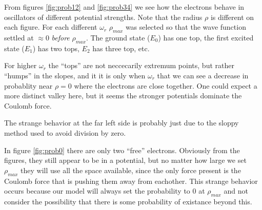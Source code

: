 

From figures \ref{fig:prob12} and \ref{fig:prob34} we see how the electrons behave in oscillators of different potential strengths. Note that the radius $\rho$ is different on each figure. For each different $\omega_r$ $\rho_{max}$ was selected so that the wave function settled at $\approx 0$ \emph{before} $\rho_{max}$. The ground state ($E_0$) has one top, the first excited state ($E_1$) has two tops, $E_2$ has three top, etc.

For higher $\omega_r$ the ``tops'' are not neccecarily extremum points, but rather ``humps'' in the slopes, and it it is only when $\omega_r$ that we can see a decrease in probablity near $\rho = 0$ where the electrons are close together. One could expect a more distinct valley here, but it seems the stronger potentials dominate the Coulomb force.

The strange behavior at the far left side is probably just due to the sloppy method used to avoid division by zero.


In figure \ref{fig:prob0} there are only two ``free'' electrons. Obviously from the figures, they still appear to be in a potential, but no matter how large we set $\rho_{max}$ they will use all the space available, since the only force present is the Coulomb force that is pushing them away from eachother. This strange behavior occurs because our model will always set the probability to 0 at $\rho_{max}$ and not consider the possibility that there is some probability of existance beyond this.
